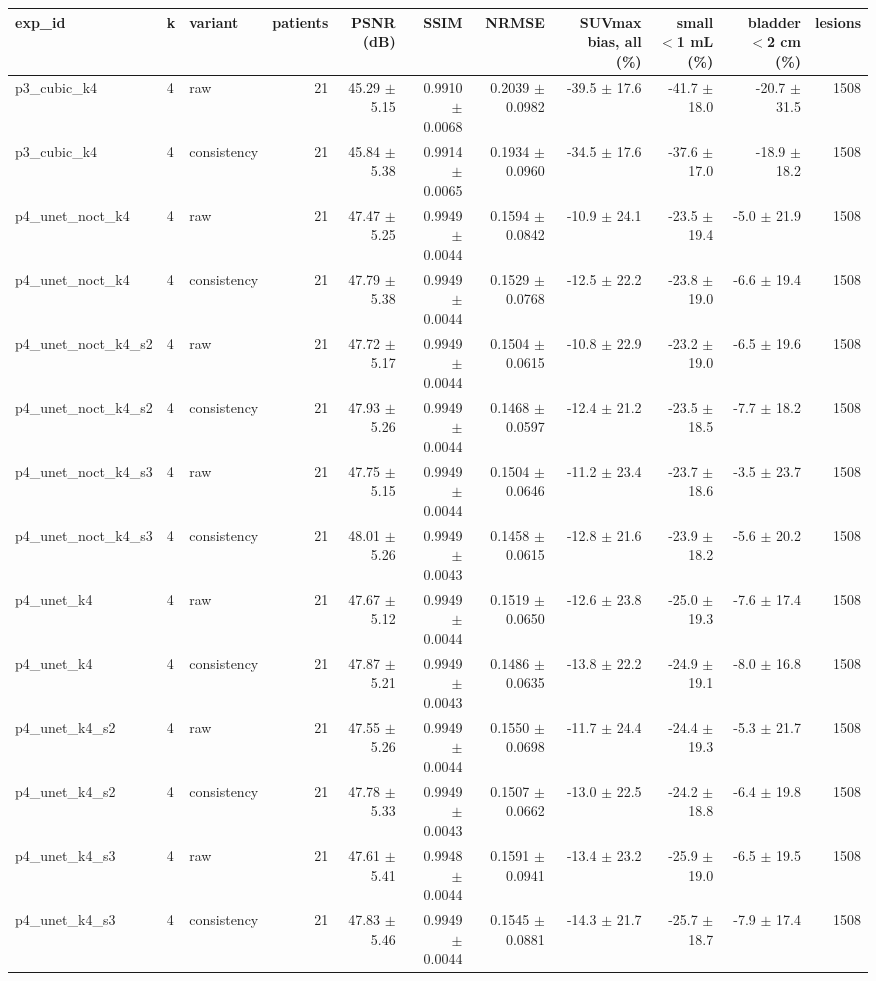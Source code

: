 \begin{tabular}{lllrrrrrrrr}
\toprule
exp\_id & k & variant & patients & PSNR (dB) & SSIM & NRMSE & SUVmax bias, all (\%) & small $<$1 mL (\%) & bladder $<$2 cm (\%) & lesions \\
\midrule
p3\_cubic\_k4 & 4 & raw & 21 & 45.29 $\pm$ 5.15 & 0.9910 $\pm$ 0.0068 & 0.2039 $\pm$ 0.0982 & -39.5 $\pm$ 17.6 & -41.7 $\pm$ 18.0 & -20.7 $\pm$ 31.5 & 1508 \\
p3\_cubic\_k4 & 4 & consistency & 21 & 45.84 $\pm$ 5.38 & 0.9914 $\pm$ 0.0065 & 0.1934 $\pm$ 0.0960 & -34.5 $\pm$ 17.6 & -37.6 $\pm$ 17.0 & -18.9 $\pm$ 18.2 & 1508 \\
p4\_unet\_noct\_k4 & 4 & raw & 21 & 47.47 $\pm$ 5.25 & 0.9949 $\pm$ 0.0044 & 0.1594 $\pm$ 0.0842 & -10.9 $\pm$ 24.1 & -23.5 $\pm$ 19.4 & -5.0 $\pm$ 21.9 & 1508 \\
p4\_unet\_noct\_k4 & 4 & consistency & 21 & 47.79 $\pm$ 5.38 & 0.9949 $\pm$ 0.0044 & 0.1529 $\pm$ 0.0768 & -12.5 $\pm$ 22.2 & -23.8 $\pm$ 19.0 & -6.6 $\pm$ 19.4 & 1508 \\
p4\_unet\_noct\_k4\_s2 & 4 & raw & 21 & 47.72 $\pm$ 5.17 & 0.9949 $\pm$ 0.0044 & 0.1504 $\pm$ 0.0615 & -10.8 $\pm$ 22.9 & -23.2 $\pm$ 19.0 & -6.5 $\pm$ 19.6 & 1508 \\
p4\_unet\_noct\_k4\_s2 & 4 & consistency & 21 & 47.93 $\pm$ 5.26 & 0.9949 $\pm$ 0.0044 & 0.1468 $\pm$ 0.0597 & -12.4 $\pm$ 21.2 & -23.5 $\pm$ 18.5 & -7.7 $\pm$ 18.2 & 1508 \\
p4\_unet\_noct\_k4\_s3 & 4 & raw & 21 & 47.75 $\pm$ 5.15 & 0.9949 $\pm$ 0.0044 & 0.1504 $\pm$ 0.0646 & -11.2 $\pm$ 23.4 & -23.7 $\pm$ 18.6 & -3.5 $\pm$ 23.7 & 1508 \\
p4\_unet\_noct\_k4\_s3 & 4 & consistency & 21 & 48.01 $\pm$ 5.26 & 0.9949 $\pm$ 0.0043 & 0.1458 $\pm$ 0.0615 & -12.8 $\pm$ 21.6 & -23.9 $\pm$ 18.2 & -5.6 $\pm$ 20.2 & 1508 \\
p4\_unet\_k4 & 4 & raw & 21 & 47.67 $\pm$ 5.12 & 0.9949 $\pm$ 0.0044 & 0.1519 $\pm$ 0.0650 & -12.6 $\pm$ 23.8 & -25.0 $\pm$ 19.3 & -7.6 $\pm$ 17.4 & 1508 \\
p4\_unet\_k4 & 4 & consistency & 21 & 47.87 $\pm$ 5.21 & 0.9949 $\pm$ 0.0043 & 0.1486 $\pm$ 0.0635 & -13.8 $\pm$ 22.2 & -24.9 $\pm$ 19.1 & -8.0 $\pm$ 16.8 & 1508 \\
p4\_unet\_k4\_s2 & 4 & raw & 21 & 47.55 $\pm$ 5.26 & 0.9949 $\pm$ 0.0044 & 0.1550 $\pm$ 0.0698 & -11.7 $\pm$ 24.4 & -24.4 $\pm$ 19.3 & -5.3 $\pm$ 21.7 & 1508 \\
p4\_unet\_k4\_s2 & 4 & consistency & 21 & 47.78 $\pm$ 5.33 & 0.9949 $\pm$ 0.0043 & 0.1507 $\pm$ 0.0662 & -13.0 $\pm$ 22.5 & -24.2 $\pm$ 18.8 & -6.4 $\pm$ 19.8 & 1508 \\
p4\_unet\_k4\_s3 & 4 & raw & 21 & 47.61 $\pm$ 5.41 & 0.9948 $\pm$ 0.0044 & 0.1591 $\pm$ 0.0941 & -13.4 $\pm$ 23.2 & -25.9 $\pm$ 19.0 & -6.5 $\pm$ 19.5 & 1508 \\
p4\_unet\_k4\_s3 & 4 & consistency & 21 & 47.83 $\pm$ 5.46 & 0.9949 $\pm$ 0.0044 & 0.1545 $\pm$ 0.0881 & -14.3 $\pm$ 21.7 & -25.7 $\pm$ 18.7 & -7.9 $\pm$ 17.4 & 1508 \\
\bottomrule
\end{tabular}
